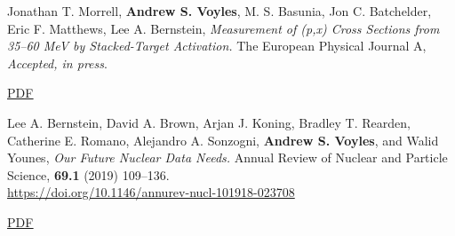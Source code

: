 \begin{bibsection}

% 




\item Jonathan T. Morrell, \textbf{Andrew S. Voyles}, M. S. Basunia, Jon C. Batchelder, Eric F. Matthews, Lee A. Bernstein, \emph{Measurement of (p,x) Cross Sections from 35--60 MeV by Stacked-Target Activation.} The European Physical Journal A, \emph{Accepted, in press}.

\ifshort \vspace{0.1cm} \href{https://arxiv.org/abs/1907.04431}{\underline{PDF}} \else  \fi 


\item Lee A. Bernstein,  David A. Brown,  Arjan J. Koning, Bradley T. Rearden,  Catherine E. Romano, Alejandro A. Sonzogni,  \textbf{Andrew S. Voyles}, and Walid Younes, \emph{Our Future Nuclear Data Needs.} Annual Review of Nuclear and Particle Science, \textbf{69.1} (2019) 109--136.
\\ \url{https://doi.org/10.1146/annurev-nucl-101918-023708}


\ifshort \vspace{0.1cm} \href{https://avoyles.github.io/papers/Bernstein2019_Our_Future_Nuclear_Data_Needs.pdf}{\underline{PDF}} \else  \fi 




\end{bibsection}
